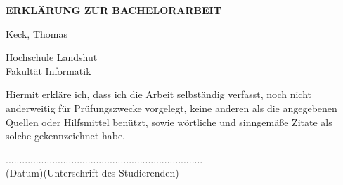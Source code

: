 \thispagestyle{empty}
\vspace{15mm}
\begin{center}
\textbf{\underline{ERKLÄRUNG ZUR BACHELORARBEIT}}
\end{center}
\vspace{25mm}
\begin{center}
\large
Keck, Thomas
\end{center}
\vspace{25mm}

\begin{center}
\huge
Hochschule Landshut \\
Fakultät Informatik 
\end{center}
\vspace{10mm}

\begin{center}
\large
Hiermit erkläre ich, dass ich die Arbeit selbständig 
verfasst, noch nicht anderweitig für Prüfungszwecke 
vorgelegt, keine anderen als die angegebenen Quellen 
oder Hilfsmittel benützt, sowie wörtliche und sinngemäße 
Zitate als solche gekennzeichnet habe.  \\
\end{center}
\vspace{55mm}

\begin{center}
....................\hspace{40mm}....................................................\\

(Datum)\hspace{47mm}(Unterschrift des Studierenden)
\end{center}
